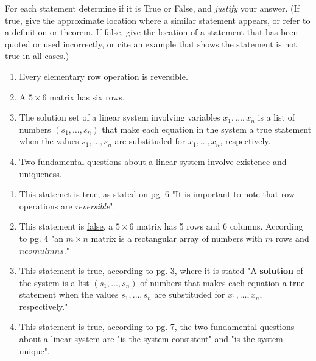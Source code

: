 \documentclass{mathhomework}
\begin{document}
\begin{problem}[1.1\#23]
    For each statement determine if it is True or False, and \textit{justify} your answer. (If true, give the approximate location where a similar statement appears, or refer to a definition or theorem. 
    If false, give the location of a statement that has been quoted or used incorrectly, or cite an example that shows the statement is not true in all cases.)
    \begin{enumerate}[label=(\alph*)]
        \item Every elementary row operation is reversible.
        \item A $5 \times 6$ matrix has six rows.
        \item The solution set of a linear system involving variables $x_1,\ldots,x_n$ is a list of numbers $(s_1, \ldots, s_n)$ that make each equation in the system a true statement when the values $s_1,\ldots,s_n$ are substituded for $x_1,\ldots,x_n$, respectively.
        \item Two fundamental questions about a linear system involve existence and uniqueness.
    \end{enumerate}

    \begin{solution}
        \begin{enumerate}[label=(\alph*)]
            \item This statemet is \underline{true}, as stated on pg. 6 "It is important to note that row operations are \textit{reversible}".
            \item This statement is \underline{false}, a $5 \times 6$ matrix has 5 rows and 6 columns. According to pg. 4 "an $m \times n$ matrix is a rectangular array of numbers with $m$ rows and $n comulmns$."
            \item This statement is \underline{true}, according to pg. 3, where it is stated "A \textbf{solution} of the system is a list $(s_1, \ldots, s_n)$ of numbers that makes each equation a true statement when the values $s_1,\ldots,s_n$ are substituded for $x_1,\ldots,x_n$, respectively."
            \item This statement is \underline{true}, according to pg. 7, the two fundamental questions about a linear system are "is the system consistent" and "is the system unique".
        \end{enumerate}
    \end{solution}
\end{problem}
\end{document}
